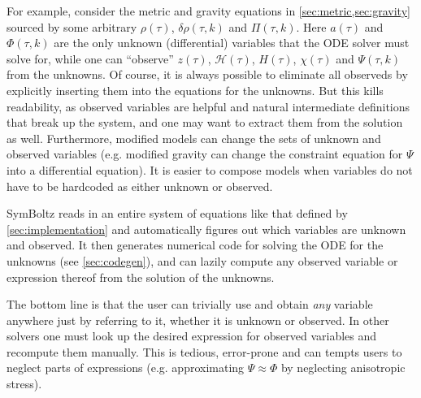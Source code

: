 \documentclass{aa}
\newcommand\scrH{\mathscr{H}}
\begin{document}
For example, consider the metric and gravity equations in \cref{sec:metric,sec:gravity} sourced by some arbitrary $\rho(\tau)$, $\delta\rho(\tau,k)$ and $\Pi(\tau,k)$.
Here $a(\tau)$ and $\Phi(\tau,k)$ are the only unknown (differential) variables that the ODE solver must solve for,
while one can \enquote{observe} \iffalse$g_{00}(\tau,k)$, $g_{ii}(\tau,k)$,\fi $z(\tau)$, $\scrH(\tau)$, $H(\tau)$, $\chi(\tau)$ and $\Psi(\tau,k)$ from the unknowns.
\iffalse%
For example, consider the trimmed background cosmology
\begin{subequations}
\begin{align}
    a^\prime(\tau) &= \sqrt{8 \pi \rho(\tau) a(\tau)^4 / 3}, \\
    \rho(\tau) &= \sum_s \rho_s(\tau), \\
    \rho_s(\tau) &= \rho_{s0} \, a(\tau)^{-3(1+w_s)},
\end{align}
\end{subequations}
in a universe with species $s$ with constant equations of state (e.g. $w_s = \{1/3, 0, -1\}$ for pure radiation, matter and a cosmological constant).
Here $a(\tau)$ is the only unknown variable that is integrated in time, while $\rho(\tau)$ and $\rho_s(\tau)$ are observed variables that can be computed from $a(\tau)$ (and the parameters $\rho_{s0}$ and $w_s$).
\fi%
Of course, it is always possible to eliminate all observeds by explicitly inserting them into the equations for the unknowns.
But this kills readability, as observed variables are helpful and natural intermediate definitions that break up the system, and one may want to extract them from the solution as well.
Furthermore, modified models can change the sets of unknown and observed variables (e.g. modified gravity can change the constraint equation for $\Psi$ into a differential equation).
It is easier to compose models when variables do not have to be hardcoded as either unknown or observed.

SymBoltz reads in an entire system of equations like that defined by \cref{sec:implementation} and automatically figures out which variables are unknown and observed.
It then generates numerical code for solving the ODE for the unknowns (see \cref{sec:codegen}),
and can lazily compute any observed variable or expression thereof from the solution of the unknowns.

The bottom line is that the user can trivially use and obtain \textit{any} variable anywhere just by referring to it, whether it is unknown or observed.
In other solvers one must look up the desired expression for observed variables and recompute them manually.
This is tedious, error-prone and can tempts users to neglect parts of expressions (e.g. approximating $\Psi \approx \Phi$ by neglecting anisotropic stress).
\end{document}
